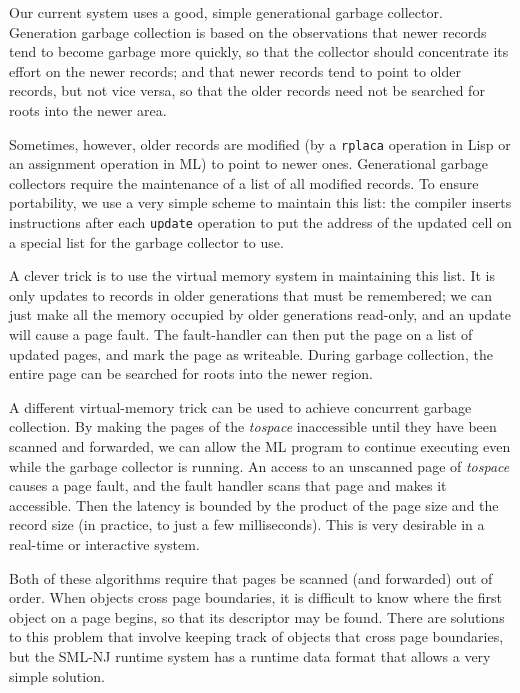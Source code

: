 Our current system uses a good, simple generational garbage
collector\cite{appel89:sggc}.  Generation garbage
collection\cite{lieberman83}\cite{ungar84} is based on the observations
that newer records tend to become garbage more quickly, so that the
collector should concentrate its effort on the newer records; and that
newer records tend to point to older records, but not vice versa, so that
the older records need not be searched for roots into the newer area.

Sometimes, however, older records are modified (by a \verb"rplaca" operation
in Lisp or an assignment operation in ML)
to point to newer ones.
Generational garbage collectors require
the maintenance of a list of all modified records.
To ensure portability,
we use a very simple scheme to maintain this list: the compiler
inserts instructions after each \verb"update" operation to put the
address of the updated cell on a special list for the garbage collector
to use.

A clever trick is to use the virtual memory system in maintaining this list.
It is only updates to records in older generations that must be remembered;
we can just make all the memory occupied  by older generations read-only,
and an update will cause a page fault.  The fault-handler can then put the
page on a list of updated pages, and mark the page as writeable.
During garbage collection, the entire page can be searched for
roots into the newer region.

A different virtual-memory trick can be used to achieve concurrent garbage
collection\cite{appel88:gc}.  By making the pages of the {\em tospace} inaccessible
until they have been scanned and forwarded, we can allow the ML program
to continue executing even while the garbage collector is running.
An access to an unscanned page of {\em tospace} causes a page fault, and the
fault handler scans that page and makes it accessible.
Then the latency is bounded by the product of the page size and the
record size (in practice, to just a few milliseconds).
This is very desirable in a real-time or interactive system.

Both of these algorithms require that pages be scanned (and forwarded)
out of order.  When objects cross page boundaries, it is difficult
to know where the first object on a page begins, so that its descriptor
may be found.  There are solutions to this problem that involve keeping
track of objects that cross page boundaries\cite{appel88:gc}, but the
SML-NJ runtime system has a runtime data format that allows a very
simple solution.

